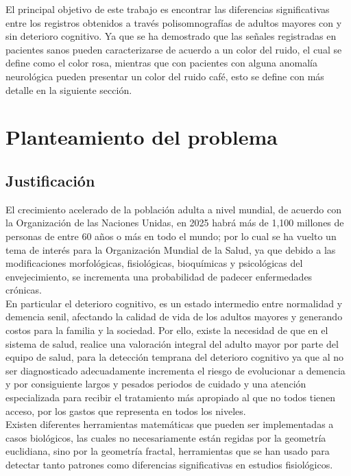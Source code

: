 \documentclass[letterpaper,titlepage,12pt,draft]{report}
\begin{document}
El principal objetivo de este trabajo es encontrar las diferencias significativas entre los registros obtenidos a trav\'es polisomnograf\'ias de adultos mayores con y sin deterioro cognitivo. Ya que se ha demostrado que las se\~nales registradas en pacientes sanos pueden caracterizarse de acuerdo a un color del ruido, el cual se define como el color rosa, mientras que con pacientes con alguna anomal\'ia neurol\'ogica pueden presentar un color del ruido caf\'e, esto se define con m\'as detalle en la siguiente secci\'on.
\newpage
\chapter{Planteamiento del problema}

\section{Justificaci\'on}

El crecimiento acelerado de la poblaci\'on adulta a nivel mundial, de acuerdo con la Organizaci\'on de las Naciones Unidas, en 2025 habr\'a m\'as de 1,100 millones de personas de entre 60 a\~nos o m\'as en todo el mundo; por lo cual se ha vuelto un tema de inter\'es para la Organizaci\'on Mundial de la Salud\cite{OMS}, ya que debido a las modificaciones morfol\'ogicas, fisiol\'ogicas, bioqu\'imicas y psicol\'ogicas del envejecimiento\cite{ING}, se incrementa una probabilidad de padecer enfermedades cr\'onicas.\\

En particular el deterioro cognitivo, es un estado intermedio entre normalidad y demencia senil, afectando la calidad de vida de los adultos mayores y generando costos para la familia y la sociedad. Por ello, existe la necesidad de que en el sistema de salud, realice una valoraci\'on integral del adulto mayor por parte del equipo de salud, para la detecci\'on temprana del deterioro cognitivo ya que al no ser diagnosticado adecuadamente incrementa el riesgo de evolucionar a demencia y por consiguiente largos y pesados periodos de cuidado y una atenci\'on especializada para recibir el tratamiento m\'as apropiado al que no todos tienen acceso, por los gastos que representa en todos los niveles.\\

Existen diferentes herramientas matem\'aticas que pueden ser implementadas a casos biol\'ogicos, las cuales no necesariamente est\'an regidas por la geometr\'ia euclidiana, sino por la geometr\'ia fractal, herramientas que se han usado para detectar tanto patrones como diferencias significativas en estudios fisiol\'ogicos{\cite{cartel}}{\cite{carteloli}}.\\
\end{document}
